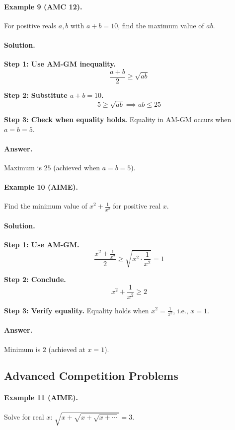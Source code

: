\documentclass[12pt]{extarticle}
\begin{document}
\paragraph{Example 9 (AMC 12).} For positive reals $a, b$ with $a+b = 10$, find the maximum value of $ab$.

\paragraph{Solution.}
\textbf{Step 1: Use AM-GM inequality.}
\[
\frac{a+b}{2} \ge \sqrt{ab}
\]

\textbf{Step 2: Substitute $a+b=10$.}
\[
5 \ge \sqrt{ab} \implies ab \le 25
\]

\textbf{Step 3: Check when equality holds.} Equality in AM-GM occurs when $a = b = 5$.

\paragraph{Answer.} Maximum is $\boxed{25}$ (achieved when $a=b=5$).

\paragraph{Example 10 (AIME).} Find the minimum value of $x^2 + \frac{1}{x^2}$ for positive real $x$.

\paragraph{Solution.}
\textbf{Step 1: Use AM-GM.}
\[
\frac{x^2 + \frac{1}{x^2}}{2} \ge \sqrt{x^2 \cdot \frac{1}{x^2}} = 1
\]

\textbf{Step 2: Conclude.}
\[
x^2 + \frac{1}{x^2} \ge 2
\]

\textbf{Step 3: Verify equality.} Equality holds when $x^2 = \frac{1}{x^2}$, i.e., $x = 1$.

\paragraph{Answer.} Minimum is $\boxed{2}$ (achieved at $x=1$).

\subsection{Advanced Competition Problems}

\paragraph{Example 11 (AIME).} Solve for real $x$: $\sqrt{x+\sqrt{x+\sqrt{x+\cdots}}} = 3$.
\end{document}
